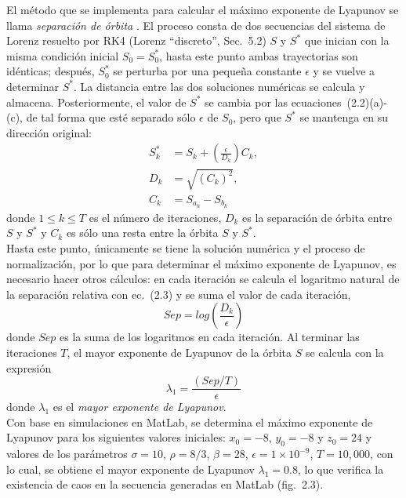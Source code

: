 El método que se implementa para calcular el máximo exponente de Lyapunov se llama \textit{separación de órbita} \cite{S_2003}. El proceso consta de dos secuencias del sistema de Lorenz resuelto por RK4 (Lorenz ``discreto'', Sec.~5.2) $S$ y $S^{*}$ que inician con la misma condición inicial $S_{0}=S^{*}_{0}$, hasta este punto ambas trayectorias son idénticas; después, $S^{*}_{0}$ se perturba por una pequeña constante $\epsilon$ y se vuelve a determinar $S^{*}$. La distancia entre las dos soluciones numéricas se calcula y almacena. Posteriormente, el valor de $S^{*}$ se cambia por las ecuaciones~(2.2)(a)-(c), de tal forma que esté separado sólo $\epsilon$ de $S_{0}$, pero que $S^{*}$ se mantenga en su dirección original:   
\begin{subequations}
\begin{align}
S^{*}_{k} & = S_{k} + (\frac{\epsilon}{D_{k}})C_{k},  \\
D_{k} & = \sqrt{(C_{k})^{2}}, \\
C_{k} & = S_{a_{k}} - S_{b_{k}}
\end{align}
\end{subequations}
donde $1 \leq k \leq T$ es el número de iteraciones, $D_{k}$ es la separación de órbita entre $S$ y $S^{*}$ y $C_{k}$ es sólo una resta entre la órbita $S$ y $S^{*}$. \\

Hasta este punto, únicamente se tiene la solución numérica y el proceso de normalización, por lo que para determinar el máximo exponente de Lyapunov, es necesario hacer otros cálculos: en cada iteración se calcula el logaritmo natural de la separación relativa con ec.~(2.3) y se suma el valor de cada iteración, 
\begin{equation}
Sep = log(\frac{D_{k}}{\epsilon}) 
\end{equation}
donde $Sep$ es la suma de los logaritmos en cada iteración. Al terminar las iteraciones $T$, el mayor exponente de Lyapunov de la órbita $S$ se calcula con la expresión
\begin{equation}
\lambda_{1} = \frac{(Sep/T)}{\epsilon}  
\end{equation}
donde $\lambda_{1}$ es el \textit{mayor exponente de Lyapunov}. \\

Con base en simulaciones en MatLab, se determina el máximo exponente de Lyapunov para los siguientes valores iniciales:  $x_{0}=-8$, $y_{0}=-8$ y $z_{0}=24$ y valores de los parámetros $\sigma=10$, $\rho=8/3$, $\beta=28$, $\epsilon=1 \times10^{-9}$, $T=10,000$, con lo cual, se obtiene el mayor exponente de Lyapunov $\lambda_{1}=0.8$, lo que verifica la existencia de caos en la secuencia generadas en MatLab (fig.~2.3).   

